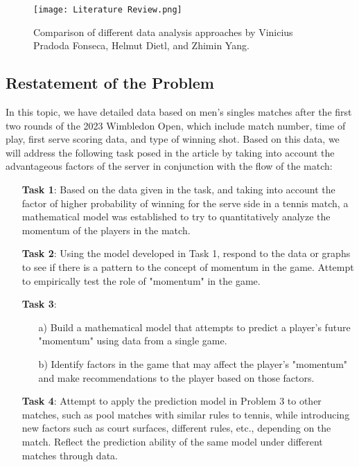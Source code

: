 \documentclass{mcmthesis}
\begin{document}
\begin{figure}[ht]
    \centering
    \texttt{[image: Literature Review.png]} %
    \caption{Comparison of different data analysis approaches by Vinicius Pradoda Fonseca, Helmut Dietl, and Zhimin Yang.}
    \label{fig:literature_review}
\end{figure}

\subsection{Restatement of the Problem}
In this topic, we have detailed data based on men's singles matches after the first two rounds of the 2023 Wimbledon Open, which include match number, time of play, first serve scoring data, and type of winning shot. Based on this data, we will address the following task posed in the article by taking into account the advantageous factors of the server in conjunction with the flow of the match:

\begin{itemize}
    \item[] {\bf Task 1}: Based on the data given in the task, and taking into account the factor of higher probability of winning for the serve side in a tennis match, a mathematical model was established to try to quantitatively analyze the momentum of the players in the match.

    \item[] {\bf Task 2}: Using the model developed in Task 1, respond to the data or graphs to see if there is a pattern to the concept of momentum in the game. Attempt to empirically test the role of "momentum" in the game.

    \item[] {\bf Task 3}:
        \begin{itemize}
            \item[a)] Build a mathematical model that attempts to predict a player's future "momentum" using data from a single game.
            \item[b)] Identify factors in the game that may affect the player's "momentum" and make recommendations to the player based on those factors.
        \end{itemize}

    \item[] {\bf Task 4}: Attempt to apply the prediction model in Problem 3 to other matches, such as pool matches with similar rules to tennis, while introducing new factors such as court surfaces, different rules, etc., depending on the match. Reflect the prediction ability of the same model under different matches through data.

\end{itemize}
\newpage
\end{document}
